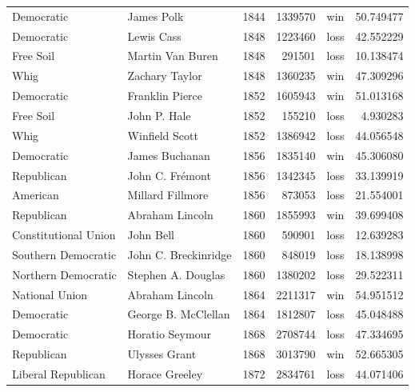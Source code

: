 \documentclass[
  letterpaper,
  DIV=11,
  numbers=noendperiod]{scrreprt}
\begin{document}
\begin{tabular}{llrrlr}
Democratic            &              James Polk &  1844 &       1339570 &    win &  50.749477 \\
Democratic            &              Lewis Cass &  1848 &       1223460 &   loss &  42.552229 \\
Free Soil             &        Martin Van Buren &  1848 &        291501 &   loss &  10.138474 \\
Whig                  &          Zachary Taylor &  1848 &       1360235 &    win &  47.309296 \\
Democratic            &         Franklin Pierce &  1852 &       1605943 &    win &  51.013168 \\
Free Soil             &            John P. Hale &  1852 &        155210 &   loss &   4.930283 \\
Whig                  &          Winfield Scott &  1852 &       1386942 &   loss &  44.056548 \\
Democratic            &          James Buchanan &  1856 &       1835140 &    win &  45.306080 \\
Republican            &         John C. Frémont &  1856 &       1342345 &   loss &  33.139919 \\
American              &        Millard Fillmore &  1856 &        873053 &   loss &  21.554001 \\
Republican            &         Abraham Lincoln &  1860 &       1855993 &    win &  39.699408 \\
Constitutional Union  &               John Bell &  1860 &        590901 &   loss &  12.639283 \\
Southern Democratic   &    John C. Breckinridge &  1860 &        848019 &   loss &  18.138998 \\
Northern Democratic   &      Stephen A. Douglas &  1860 &       1380202 &   loss &  29.522311 \\
National Union        &         Abraham Lincoln &  1864 &       2211317 &    win &  54.951512 \\
Democratic            &     George B. McClellan &  1864 &       1812807 &   loss &  45.048488 \\
Democratic            &         Horatio Seymour &  1868 &       2708744 &   loss &  47.334695 \\
Republican            &           Ulysses Grant &  1868 &       3013790 &    win &  52.665305 \\
Liberal Republican    &          Horace Greeley &  1872 &       2834761 &   loss &  44.071406 \\

\end{tabular}
\end{document}
